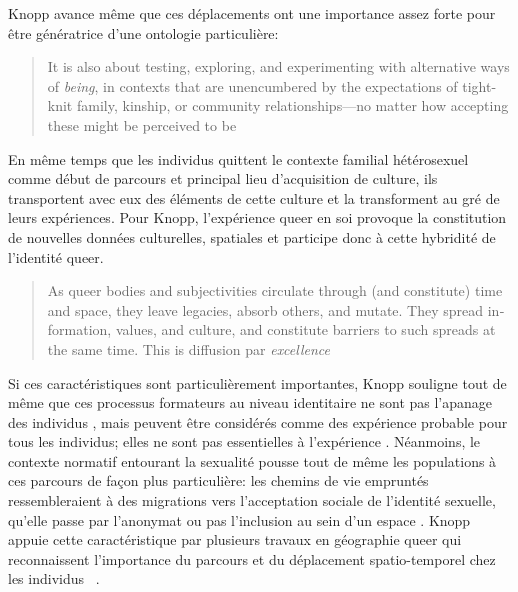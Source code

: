 Knopp avance même que ces déplacements ont une importance assez forte pour être génératrice d'une ontologie particulière:
\foreignblockquote{english}[{\cite[123]{Knopp2004}}][.]{It is also about testing, exploring, and experimenting with alternative ways of \emph{being}, in contexts that are unencumbered by the expectations of tight-knit family, kinship, or community relationships—no matter how accepting these might be perceived to be} 
En même temps que les individus \lgbt{} quittent le contexte familial hétérosexuel comme début de parcours et principal lieu d'acquisition de culture, ils transportent avec eux des éléments de cette culture et la transforment au gré de leurs expériences. 
Pour Knopp, l'expérience queer en soi provoque la constitution de nouvelles données culturelles, spatiales et participe donc à cette hybridité de l'identité queer.
\foreignblockquote{english}[{\cite[130]{Knopp2004}}][.]{As queer bodies and subjectivities circulate through (and constitute) time and space, they leave legacies, absorb others, and mutate. They spread information, values, and culture, and constitute barriers to such spreads at the same time. This is diffusion par \emph{excellence}}

Si ces caractéristiques sont particulièrement importantes, Knopp souligne tout de même que ces processus formateurs au niveau identitaire ne sont pas l'apanage des individus \lgbt{}, mais peuvent être considérés comme des expérience probable pour tous les individus; elles ne sont pas essentielles à l'expérience \lgbt{}.
Néanmoins, le contexte normatif entourant la sexualité pousse tout de même les populations \lgbt{} à ces parcours de façon plus particulière: les chemins de vie empruntés ressembleraient à des migrations vers l'acceptation sociale de l'identité sexuelle, qu'elle passe par l'anonymat ou pas l'inclusion au sein d'un espace \lgbt{}. 
Knopp appuie cette caractéristique par plusieurs travaux en géographie queer qui reconnaissent l'importance du parcours et du déplacement spatio-temporel chez les individus \lgbt{}~\citep[123]{Knopp2004}.



